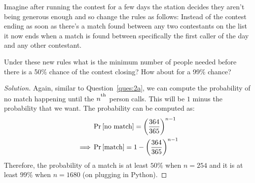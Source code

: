 \begin{solution}[label=ques:2c]
  \begin{question}
    Imagine after running the contest for a few days the station decides they aren't being generous enough and so change the rules as follows: Instead of the contest ending as soon as there's a match found between any two contestants on the list it now ends when a match is found between specifically the first caller of the day and any other contestant. 

Under these new rules what is the minimum number of people needed before there is a 50\% chance of the contest closing? How about for a 99\% chance?
  \end{question}
  \tcblower{}
  \begin{proof}[Solution]
    Again, similar to Question~\ref{ques:2a}, we can compute the probability of no match happening until the $n^\textsuperscript{th}$ person calls. This will be $1$ minus the probability that we want. The probability can be computed as:
    \begin{equation}
      \begin{split}
        &\Pr\left[ \text{no match} \right] = \left(\frac{364}{365}\right)^{n-1}\\
        \implies &\Pr\left[ \text{match} \right] = 1 - \left(\frac{364}{365}\right)^{n-1}
      \end{split}
      \label{eq:mbbnomatch}
    \end{equation}
    Therefore, the probability of a match is at least $50\%$ when $n = 254$ and it is at least $99\%$ when $n = 1680$ (on plugging in Python).
  \end{proof}
\end{solution}
